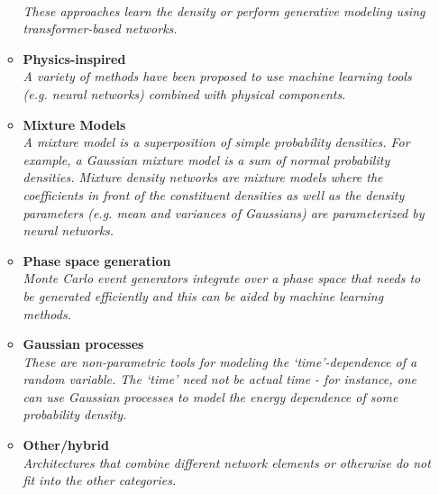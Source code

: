 \documentclass[12pt,letterpaper]{article}
\begin{document}
\begin{itemize}
\begin{itemize}
		\\\textit{These approaches learn the density or perform generative modeling using transformer-based networks.}
		\item \textbf{Physics-inspired}~\cite{Abasov:2024hyq,Larkoski:2023xam,Barenboim:2021vzh,Lai:2020byl,1808876,Andreassen:2019txo,Andreassen:2018apy}
		\\\textit{A variety of methods have been proposed to use machine learning tools (e.g. neural networks) combined with physical components.}
		\item \textbf{Mixture Models}~\cite{Vermunt:2023fsr,Liu:2022dem,Graziani:2021vai,Burton:2021tsd,Chen:2020uds}
		\\\textit{A mixture model is a superposition of simple probability densities.  For example, a Gaussian mixture model is a sum of normal probability densities.  Mixture density networks are mixture models where the coefficients in front of the constituent densities as well as the density parameters (e.g. mean and variances of Gaussians) are parameterized by neural networks.}
		\item \textbf{Phase space generation}~\cite{Deutschmann:2024lml,Calisto:2023vmm,Singh:2023yvj,Renteria-Estrada:2023buo,Heimel:2022wyj,Jinno:2022sbr,Maitre:2022xle,Yoon:2020zmb,Danziger:2021eeg,Backes:2020vka,Verheyen:2020bjw,Chen:2020nfb,Nachman:2020fff,Carrazza:2020rdn,Klimek:2018mza,Gao:2020vdv,Gao:2020zvv,Bothmann:2020ywa,Bendavid:2017zhk}
		\\\textit{Monte Carlo event generators integrate over a phase space that needs to be generated efficiently and this can be aided by machine learning methods.}
		\item \textbf{Gaussian processes}~\cite{Cisbani:2019xta,1804325,Bertone:2016mdy,Frate:2017mai}
		\\\textit{These are non-parametric tools for modeling the `time'-dependence of a random variable.  The `time' need not be actual time - for instance, one can use Gaussian processes to model the energy dependence of some probability density.}
		\item \textbf{Other/hybrid}~\cite{Sahu:2023uwb,Santos:2023mib,Kronheim:2023jrl,Butter:2023fov,Kansal:2022spb,Li:2022jon,DiBello:2022rss,Cresswell:2022tof}
		\\\textit{Architectures that combine different network elements or otherwise do not fit into the other categories.}
	\end{itemize}

\end{itemize}
\end{document}
